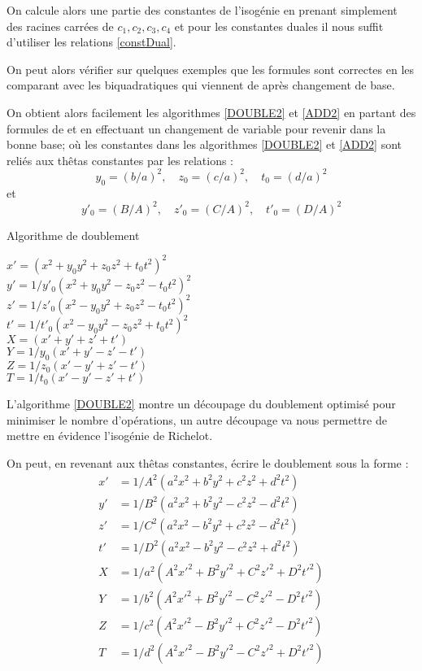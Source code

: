 \documentclass[a4paper,12pt]{article}
\theoremstyle{definition}
\theoremstyle{remark}
\numberwithin{equation}{section}
\begin{document}
On calcule alors une partie des constantes de l'isogénie en prenant simplement des racines carrées de $c_1,c_2,c_3,c_4$ et pour les constantes duales il nous suffit d'utiliser les relations \ref{constDual}.

On peut alors vérifier sur quelques exemples que les formules sont correctes en les comparant avec les biquadratiques qui viennent de \citep{biquad} après changement de base.

On obtient alors facilement les algorithmes \ref{DOUBLE2} et \ref{ADD2} en partant des formules de \citep{gaudry} et en effectuant un changement de variable pour revenir dans la bonne base; où les constantes dans les algorithmes \ref{DOUBLE2} et \ref{ADD2} sont reliés aux thêtas constantes par les relations :
$$y_0 = (b/a)^2, \quad z_0 = (c/a)^2, \quad t_0 = (d/a)^2$$
et
$$y'_0 = (B/A)^2, \quad z'_0 = (C/A)^2, \quad t'_0 = (D/A)^2$$

\begin{algorithm}
\label{DOUBLE2}
\caption{Algorithme de doublement}
$x' = (x^2 + y_0y^2 + z_0z^2 + t_0t^2)^2$ \\
$y' = 1/y'_0(x^2 + y_0y^2 - z_0z^2 - t_0t^2)^2$ \\
$z' = 1/z'_0(x^2 - y_0y^2 + z_0z^2 - t_0t^2)^2$ \\
$t' = 1/t'_0(x^2 - y_0y^2 - z_0z^2 + t_0t^2)^2$ \\
$X = (x' + y' + z' + t')$ \\
$Y = 1/y_0(x' + y' - z' - t')$ \\
$Z = 1/z_0(x' - y' + z' - t')$ \\
$T = 1/t_0(x' - y' - z' + t')$ \\
\end{algorithm}

L'algorithme \ref{DOUBLE2} montre un découpage du doublement optimisé pour minimiser le nombre d'opérations, un autre découpage va nous permettre de mettre en évidence l'isogénie de Richelot.

On peut, en revenant aux thêtas constantes, écrire le doublement sous la forme : 
\begin{align*}
x' &= 1/A^2(a^2x^2 + b^2y^2 + c^2z^2 + d^2t^2) \\
y' &= 1/B^2(a^2x^2 + b^2y^2 - c^2z^2 - d^2t^2) \\
z' &= 1/C^2(a^2x^2 - b^2y^2 + c^2z^2 - d^2t^2) \\
t' &= 1/D^2(a^2x^2 - b^2y^2 - c^2z^2 + d^2t^2) \\
X &= 1/a^2(A^2x'^2 + B^2y'^2 + C^2z'^2 + D^2t'^2) \\
Y &= 1/b^2(A^2x'^2 + B^2y'^2 - C^2z'^2 - D^2t'^2) \\
Z &= 1/c^2(A^2x'^2 - B^2y'^2 + C^2z'^2 - D^2t'^2) \\
T &= 1/d^2(A^2x'^2 - B^2y'^2 - C^2z'^2 + D^2t'^2) \\
\end{align*}
\end{document}
